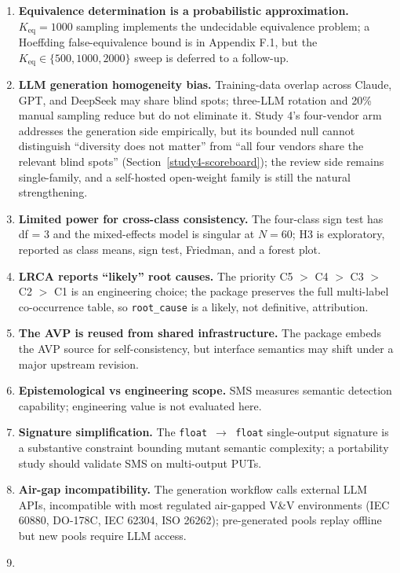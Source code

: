 \documentclass[manuscript,screen,review]{acmart}
\begin{document}
\begin{enumerate}
\item
  \textbf{Equivalence determination is a probabilistic approximation.}
  $K_{\mathrm{eq}} = 1000$ sampling implements the undecidable equivalence
  problem; a Hoeffding false-equivalence bound is in Appendix F.1, but the
  $K_{\mathrm{eq}} \in \{500, 1000, 2000\}$ sweep is deferred to a follow-up.
\item
  \textbf{LLM generation homogeneity bias.} Training-data overlap across Claude,
  GPT, and DeepSeek may share blind spots; three-LLM rotation and 20\% manual
  sampling reduce but do not eliminate it. Study 4's four-vendor arm
  addresses the generation side empirically, but its bounded null cannot
  distinguish ``diversity does not matter'' from ``all four vendors share the
  relevant blind spots'' (Section~\ref{study4-scoreboard}); the review side
  remains single-family, and a self-hosted open-weight family is still the
  natural strengthening.
\item
  \textbf{Limited power for cross-class consistency.} The four-class sign test
  has df = 3 and the mixed-effects model is singular at $N = 60$; H3 is
  exploratory, reported as class means, sign test, Friedman, and a forest plot.
\item
  \textbf{LRCA reports ``likely'' root causes.} The priority
  C5 $>$ C4 $>$ C3 $>$ C2 $>$ C1 is an engineering choice; the package preserves
  the full multi-label co-occurrence table, so \texttt{root\_cause} is a likely,
  not definitive, attribution.
\item
  \textbf{The AVP is reused from shared infrastructure.} The package embeds the
  AVP source for self-consistency, but interface semantics may shift under a
  major upstream revision.
\item
  \textbf{Epistemological vs engineering scope.} SMS measures semantic detection
  capability; engineering value is not evaluated here.
\item
  \textbf{Signature simplification.} The \texttt{float\ $\to$\ float}
  single-output signature is a substantive constraint bounding mutant semantic
  complexity; a portability study should validate SMS on multi-output PUTs.
\item
  \textbf{Air-gap incompatibility.} The generation workflow calls external LLM
  APIs, incompatible with most regulated air-gapped V\&V environments (IEC 60880,
  DO-178C, IEC 62304, ISO 26262); pre-generated pools replay offline but new
  pools require LLM access.
\item

\end{enumerate}
\end{document}
